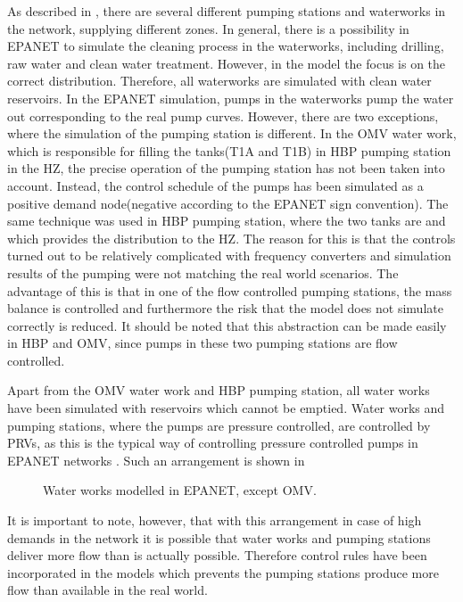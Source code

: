As described in , there are several different pumping stations and waterworks in the network, supplying different zones. In general, there is a possibility in EPANET to simulate the cleaning process in the waterworks, including drilling, raw water and clean water treatment. However, in the model the focus is on the correct distribution. Therefore, all waterworks are simulated with clean water reservoirs. In the EPANET simulation, pumps in the waterworks pump the water out corresponding to the real pump curves. However, there are two exceptions, where the simulation of the pumping station is different. In the OMV water work, which is responsible for filling the tanks(T1A and T1B) in HBP pumping station in the HZ, the precise operation of the pumping station has not been taken into account. Instead, the control schedule of the pumps has been simulated as a positive demand node(negative according to the EPANET sign convention). The same technique was used in HBP pumping station, where the two tanks are and which provides the distribution to the HZ. The reason for this is that the controls turned out to be relatively complicated with frequency converters and simulation results of the pumping were not matching the real world scenarios. The advantage of this is that in one of the flow controlled pumping stations, the mass balance is controlled and furthermore the risk that the model does not simulate correctly is reduced. It should be noted that this abstraction can be made easily in HBP and OMV, since pumps in these two pumping stations are flow controlled. 

Apart from the OMV water work and HBP pumping station, all water works have been simulated with reservoirs which cannot be emptied. Water works and pumping stations, where the pumps are pressure controlled, are controlled by PRVs, as this is the typical way of controlling pressure controlled pumps in EPANET networks \cite{agency2016epanet}. Such an arrangement is shown in  

\begin{figure}[H]
\centering
 
\caption{Water works modelled in EPANET, except OMV.}
\label{fig:PRV_EPANET}
\end{figure}

\vspace{-3mm}
It is important to note, however, that with this arrangement in case of high demands in the network it is possible that water works and pumping stations deliver more flow than is actually possible. Therefore control rules have been incorporated in the models which prevents the pumping stations produce more flow than available in the real world. 

